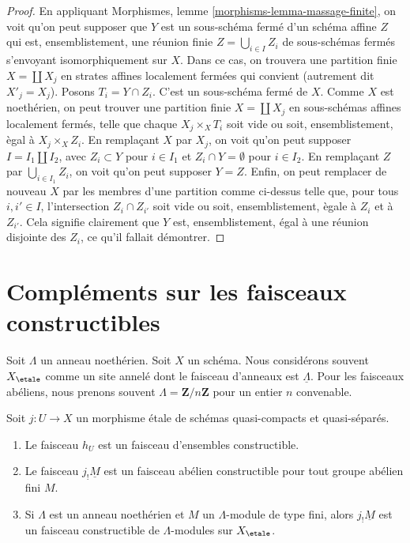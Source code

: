 \begin{proof}
\medskip\noindent
En appliquant Morphismes, lemme \ref{morphisms-lemma-massage-finite},
on voit qu'on peut supposer que $Y$ est un sous-sch\'ema ferm\'e d'un
sch\'ema affine $Z$ qui est, ensemblistement, une r\'eunion finie
$Z = \bigcup_{i \in I} Z_i$ de sous-sch\'emas ferm\'es s'envoyant isomorphiquement
sur $X$. Dans ce cas, on trouvera une partition finie $X = \coprod X_j$
en strates affines localement ferm\'ees qui convient (autrement dit $X'_j = X_j$).
Posons $T_i = Y \cap Z_i$. C'est un sous-sch\'ema ferm\'e de $X$.
Comme $X$ est noeth\'erien, on peut trouver une partition finie $X = \coprod X_j$
en sous-sch\'emas affines localement ferm\'es, telle que chaque
$X_j \times_X T_i$ soit vide ou soit, ensemblistement, \`egal \`a $X_j \times_X Z_i$.
En rempla\c cant $X$ par $X_j$, on voit qu'on peut supposer $I = I_1 \amalg I_2$,
avec $Z_i \subset Y$ pour $i \in I_1$ et $Z_i \cap Y = \emptyset$ pour
$i \in I_2$. En rempla\c cant $Z$ par $\bigcup_{i \in I_1} Z_i$, on voit qu'on
peut supposer $Y = Z$.
Enfin, on peut remplacer de nouveau $X$ par les membres d'une partition
comme ci-dessus telle que, pour tous $i, i' \in I$, l'intersection
$Z_i \cap Z_{i'}$ soit vide ou soit, ensemblistement, \`egale
\`a $Z_i$ et \`a $Z_{i'}$. Cela signifie clairement que $Y$ est, ensemblistement,
\'egal \`a une r\'eunion disjointe des $Z_i$, ce qu'il fallait d\'emontrer.
\end{proof}








\section{Compl\'ements sur les faisceaux constructibles}
\label{section-more-constructible}

\noindent
Soit $\Lambda$ un anneau noeth\'erien. Soit $X$ un sch\'ema.
Nous consid\'erons souvent $X_\etale$ comme un site annel\'e dont le
faisceau d'anneaux est $\underline{\Lambda}$. Pour les faisceaux ab\'eliens,
nous prenons souvent $\Lambda = \mathbf{Z}/n\mathbf{Z}$ pour un
entier $n$ convenable.

\begin{lemma}
\label{lemma-jshriek-constructible}
Soit $j : U \to X$ un morphisme \'etale de sch\'emas quasi-compacts et
quasi-s\'epar\'es.
\begin{enumerate}
\item Le faisceau $h_U$ est un faisceau d'ensembles constructible.
\item Le faisceau $j_!\underline{M}$ est un faisceau ab\'elien constructible
pour tout groupe ab\'elien fini $M$.
\item Si $\Lambda$ est un anneau noeth\'erien et $M$ un $\Lambda$-module de type fini,
alors $j_!\underline{M}$ est un faisceau constructible de $\Lambda$-modules
sur $X_\etale$.
\end{enumerate}
\end{lemma}

